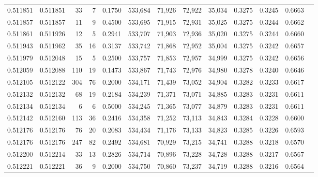 \begin{tabular}{rrrrrrrrrrrrr}
0.511851 & 0.511851 &    33 &     7 &                                     0.1750 & 533,684 &  71,926 &  72,922 &  35,034 & 0.3275 & 0.3245 & 0.6663 \\
0.511857 & 0.511857 &    11 &     9 &                                     0.4500 & 533,695 &  71,915 &  72,931 &  35,025 & 0.3275 & 0.3244 & 0.6662 \\
0.511861 & 0.511926 &    12 &     5 &                                     0.2941 & 533,707 &  71,903 &  72,936 &  35,020 & 0.3275 & 0.3244 & 0.6660 \\
0.511943 & 0.511962 &    35 &    16 &                                     0.3137 & 533,742 &  71,868 &  72,952 &  35,004 & 0.3275 & 0.3242 & 0.6657 \\
0.511979 & 0.512048 &    15 &     5 &                                     0.2500 & 533,757 &  71,853 &  72,957 &  34,999 & 0.3275 & 0.3242 & 0.6656 \\
0.512059 & 0.512088 &   110 &    19 &                                     0.1473 & 533,867 &  71,743 &  72,976 &  34,980 & 0.3278 & 0.3240 & 0.6646 \\
0.512105 & 0.512122 &   304 &    76 &                                     0.2000 & 534,171 &  71,439 &  73,052 &  34,904 & 0.3282 & 0.3233 & 0.6617 \\
0.512132 & 0.512132 &    68 &    19 &                                     0.2184 & 534,239 &  71,371 &  73,071 &  34,885 & 0.3283 & 0.3231 & 0.6611 \\
0.512134 & 0.512134 &     6 &     6 &                                     0.5000 & 534,245 &  71,365 &  73,077 &  34,879 & 0.3283 & 0.3231 & 0.6611 \\
0.512142 & 0.512160 &   113 &    36 &                                     0.2416 & 534,358 &  71,252 &  73,113 &  34,843 & 0.3284 & 0.3228 & 0.6600 \\
0.512176 & 0.512176 &    76 &    20 &                                     0.2083 & 534,434 &  71,176 &  73,133 &  34,823 & 0.3285 & 0.3226 & 0.6593 \\
0.512176 & 0.512176 &   247 &    82 &                                     0.2492 & 534,681 &  70,929 &  73,215 &  34,741 & 0.3288 & 0.3218 & 0.6570 \\
0.512200 & 0.512214 &    33 &    13 &                                     0.2826 & 534,714 &  70,896 &  73,228 &  34,728 & 0.3288 & 0.3217 & 0.6567 \\
0.512221 & 0.512221 &    36 &     9 &                                     0.2000 & 534,750 &  70,860 &  73,237 &  34,719 & 0.3288 & 0.3216 & 0.6564 \\

\end{tabular}
